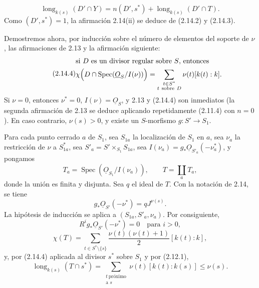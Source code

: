\pageoriginale

\begin{equation}\tag{2.14.3}
\operatorname{long}_{k(s)}(D'\cap Y)
=n(D',s^*)+\operatorname{long}_{k(s)}(D'\cap T).
\end{equation}
Como $(D',s^*)=1$, la afirmación 2.14(ii) se deduce de (2.14.2) y (2.14.3).

Demostremos ahora, por inducción sobre el número de elementos del soporte de
$\nu$, las afirmaciones de 2.13 y la afirmación siguiente:
\begin{equation}\tag{2.14.4}
\begin{aligned}
&\text{si $D$ es un divisor regular sobre $S$, entonces}\\
&\chi\Bigl(D\cap\operatorname{Spec}(\underline{O}_S/I(\nu))\Bigr)
=\sum_{\substack{t\in S^*\\t\ \mathrm{sobre}\ D}}
\nu(t)[k(t):k].
\end{aligned}
\end{equation}
Si $\nu=0$, entonces $\nu^*=0$, $I(\nu)=\underline{O}_S$, y 2.13 y (2.14.4)
son inmediatos (la segunda afirmación de 2.13 se deduce aplicando repetidamente
(2.11.4) con $n=0$). En caso contrario, $\nu(s)>0$, y existe un $S$-morfismo
$g:S'\longrightarrow S_1$.

Para cada punto cerrado $a$ de $S_1$, sea $S_{1a}$ la localización de $S_1$ en
$a$, sea $\nu_a$ la restricción de $\nu$ a $S_{1a}^*$, sea
$S'_a=S'\times_{S_1}S_{1a}$, sea
$I(\nu_a)=g_*\underline{O}_{S'_a}(-\nu_a^*)$, y pongamos
\begin{equation*}
T_a=\operatorname{Spec}(\underline{O}_{S_1}/I(\nu_a)),\qquad
T=\coprod_aT_a,
\end{equation*}
donde la unión es finita y disjunta. Sea $q$ el ideal de $T$. Con la notación de
2.14, se tiene
\begin{equation}\tag{2.14.5}
g_*\underline{O}_{S'}(-\nu^*)=qJ^{\nu(s)}.
\end{equation}
La hipótesis de inducción se aplica a $(S_{1a},S'_a,\nu_a)$. Por consiguiente,
\begin{equation}\tag{2.14.6}
R^ig_*\underline{O}_{S'}(-\nu^*)=0\quad\text{para }i>0,
\end{equation}
\begin{equation}\tag{2.14.7}
\chi(T)=
\sum_{t\in S^*\setminus\{s\}}
\frac{\nu(t)(\nu(t)+1)}2[k(t):k],
\end{equation}
y, por (2.14.4) aplicada al divisor $s^*$ sobre $S_1$ y por (2.12.1),
\begin{equation*}
\operatorname{long}_{k(s)}(T\cap s^*)
=\sum_{\substack{t\ \text{próximo}\\\text{a }s}}
\nu(t)[k(t):k(s)]
\leq\nu(s).
\end{equation*}


